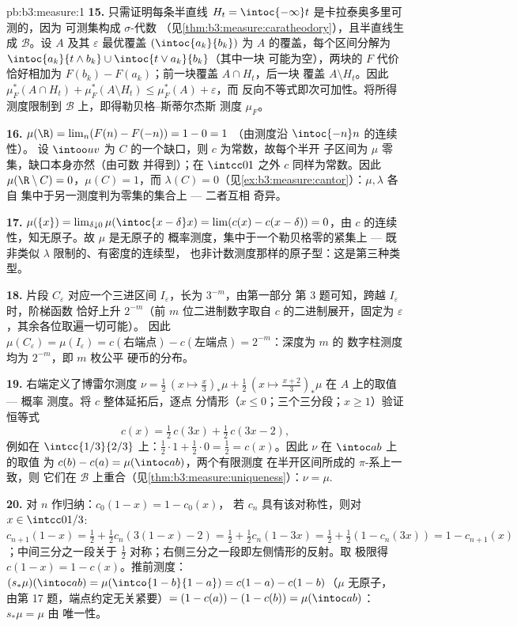 \begin{solution}{pb:b3:measure:1}
\textbf{15.} 只需证明每条半直线 $H_t =
\intoc{-\infty}t$ 是卡拉泰奥多里可测的，因为
可测集构成 $\sigma$-代数
（见\cref{thm:b3:measure:caratheodory}），且半直线生成
$\mathcal B$。设 $A$ 及其 $\varepsilon$ 最优覆盖
$(\intoc{a_k}{b_k})$ 为 $A$ 的覆盖，每个区间分解为
$\intoc{a_k}{t\wedge b_k} \cup \intoc{t \vee a_k}{b_k}$（其中一块
可能为空），两块的 $F$ 代价恰好相加为
$F(b_k) - F(a_k)$；前一块覆盖 $A \cap H_t$，后一块
覆盖 $A \setminus H_t$。因此 $\mu_F^*(A\cap H_t) +
\mu_F^*(A\setminus H_t) \leq \mu_F^*(A) + \varepsilon$，而
反向不等式即次可加性。将所得
测度限制到 $\mathcal B$ 上，即得勒贝格–斯蒂尔杰斯
测度 $\mu_F$。

\textbf{16.} $\mu(\R) = \lim_n(F(n) - F(-n)) = 1 - 0 = 1$
（由测度沿 $\intoc{-n}n$ 的连续性）。
设 $\intoo uv$ 为 $C$ 的一个缺口，则 $c$ 为常数，故每个半开
子区间为 $\mu$ 零集，缺口本身亦然（由可数
并得到）；在 $\intcc01$ 之外 $c$ 同样为常数。因此
$\mu(\R\setminus C) = 0$，$\mu(C) = 1$，而 $\lambda(C) =
0$（见\cref{ex:b3:measure:cantor}）：$\mu, \lambda$ 各自
集中于另一测度判为零集的集合上 --- 二者互相
奇异。

\textbf{17.} $\mu(\{x\}) = \lim_{\delta\downarrow0}
\mu(\intoc{x-\delta}x) = \lim(c(x) - c(x-\delta)) = 0$，由
$c$ 的连续性，知无原子。故 $\mu$ 是无原子的
概率测度，集中于一个勒贝格零的紧集上 ---
既非类似 $\lambda$ 限制的、有密度的连续型，
也非计数测度那样的原子型：这是第三种类型。

\textbf{18.} 片段 $C_\varepsilon$ 对应一个三进区间
$I_\varepsilon$，长为 $3^{-m}$，由第一部分
第 3 题可知，跨越 $I_\varepsilon$ 时，阶梯函数
恰好上升 $2^{-m}$（前 $m$ 位二进制数字取自 $c$
的二进制展开，固定为 $\varepsilon$，其余各位取遍一切可能）。
因此 $\mu(C_\varepsilon) = \mu(I_\varepsilon) =
c(\text{右端点}) - c(\text{左端点}) = 2^{-m}$：深度为 $m$ 的
数字柱测度均为 $2^{-m}$，即 $m$ 枚公平
硬币的分布。

\textbf{19.} 右端定义了博雷尔测度
$\nu = \frac12\,(x \mapsto \tfrac x3)_*\mu + \frac12\,(x
\mapsto \tfrac{x+2}3)_*\mu$ 在 $A$ 上的取值 --- 概率
测度。将 $c$ 整体延拓后，逐点
分情形（$x \leq 0$；三个三分段；$x \geq 1$）验证
恒等式
\[
c(x) = \tfrac12\,c(3x) + \tfrac12\,c(3x - 2),
\]
例如在 $\intcc{1/3}{2/3}$ 上：$\frac12\cdot1 + \frac12\cdot0 =
\frac12 = c(x)$。因此 $\nu$ 在 $\intoc ab$ 上的取值
为 $c(b) - c(a) = \mu(\intoc ab)$，两个有限测度
在半开区间所成的 $\pi$-系上一致，则
它们在 $\mathcal B$ 上重合（见\cref{thm:b3:measure:uniqueness}）：$\nu =
\mu$.

\textbf{20.} 对 $n$ 作归纳：$c_0(1-x) = 1 - c_0(x)$，
若 $c_n$ 具有该对称性，则对 $x \in
\intcc0{1/3}$: $c_{n+1}(1 - x) = \frac12 + \frac12c_n(3(1-x)
- 2) = \frac12 + \frac12c_n(1 - 3x) = \frac12 + \frac12(1 -
c_n(3x)) = 1 - c_{n+1}(x)$；中间三分之一段关于
$\frac12$ 对称；右侧三分之一段即左侧情形的反射。取
极限得 $c(1-x) = 1 - c(x)$。推前测度：$(s_*\mu)(\intoc ab)
= \mu(\intco{1-b}{1-a}) = c(1-a) - c(1-b)$（$\mu$ 无原子，
由第 17 题，端点约定无关紧要）$= (1 -
c(a)) - (1 - c(b)) = \mu(\intoc ab)$：$s_*\mu = \mu$ 由
唯一性。


\end{solution}
